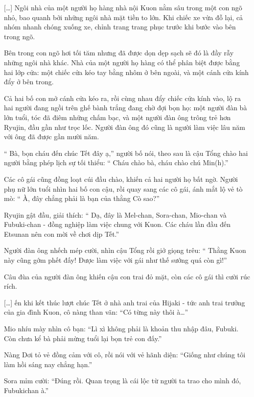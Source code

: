 \documentclass[../main.tex]{subfiles}
\begin{document}
\il

[\dots] Ngôi nhà của một người họ hàng nhà nội Kuon nằm sâu trong một con ngõ nhỏ, bao quanh bởi những ngôi nhà mặt tiền to lớn. Khi chiếc xe vừa đỗ lại, cả nhóm nhanh chóng xuống xe, chỉnh trang trang phục trước khi bước vào bên trong ngõ.

Bên trong con ngõ hơi tối tăm nhưng đã được dọn dẹp sạch sẽ đó là đầy rẫy những ngôi nhà khác. Nhà của một người họ hàng có thể phân biệt được bằng hai lớp cửa: một chiếc cửa kéo tay bằng nhôm ở bên ngoài, và một cánh cửa kính đẩy ở bên trong.

Cả hai bố con mở cánh cửa kéo ra, rồi cùng nhau đẩy chiếc cửa kính vào, lộ ra hai người đang ngồi trên ghế bành trắng đang chờ đợi bọn họ: một người đàn bà lớn tuổi, tóc đã điêm những chấm bạc, và một người đàn ông trông trẻ hơn Ryujin, đầu gần như trọc lốc. Người đàn ông đó cũng là người làm việc lâu năm với ông đã được gần mười năm.

``{\color{red} Bà, bọn cháu đến chúc Tết đây ạ,}'' người bố nói, theo sau là cậu Tổng chào hai người bằng phép lịch sự tối thiểu: ``{\color{red} Cháu chào bà, cháu chào chú Min(h).}''

Các cô gái cũng đồng loạt cúi đầu chào, khiến cả hai người họ bất ngờ. Người phụ nữ lớn tuổi nhìn hai bố con cậu, rồi quay sang các cô gái, ánh mắt lộ vẻ tò mò: ``{\color{red} À, đây chẳng phải là bạn của thằng Cò sao?}''

Ryujin gật đầu, giải thích: ``{\color{red} Dạ, đây là Mel-chan, Sora-chan, Mio-chan và Fubuki-chan - đồng nghiệp làm việc chung với Kuon. Các cháu lần đầu đến Etsunan nên con mời về chơi dịp Tết.}''

Người đàn ông nhếch mép cười, nhìn cậu Tổng rồi giở giọng trêu: ``{\color{red} Thằng Kuon này cũng gớm phết đấy! Được làm việc với gái như thế sướng quá còn gì!}''

Câu đùa của người đàn ông khiến cậu con trai đỏ mặt, còn các cô gái thì cười rúc rích.

    [\dots] ến khi kết thúc lượt chúc Tết ở nhà anh trai của Hijaki - tức anh trai trưởng của gia đình Kuon, cô nàng than vãn: ``Có từng này thôi à\dots''

Mio nhíu mày nhìn cô bạn: ``Lì xì không phải là khoản thu nhập đâu, Fubuki. Còn chưa kể bà phải mừng tuổi lại bọn trẻ con đấy.''

Nàng Dơi tỏ vẻ đồng cảm với cô, rồi nói với vẻ hãnh diện: ``Giống như chúng tôi làm hồi sáng nay chẳng hạn.''

Sora mỉm cười: ``Đúng rồi. Quan trọng là cái lộc từ người ta trao cho mình đó, Fubukichan à.''
\end{document}
